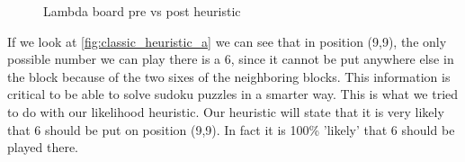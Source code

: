 \documentclass{report}
\begin{document}
\begin{figure}[h]
    \centering
    \qquad
    \caption{Lambda board pre vs post heuristic}%
\end{figure}
If we look at \ref{fig:classic_heuristic_a} we can see that in position (9,9), the only possible number we can play there is a 6, since it cannot be put anywhere else in the block because of the two sixes of the neighboring blocks. This information is critical to be able to solve sudoku puzzles in a smarter way. This is what we tried to do with our likelihood heuristic. Our heuristic will state that it is very likely that 6 should be put on position (9,9). In fact it is 100\% 'likely' that 6 should be played there.
\newline
\newline
\newline
\end{document}
